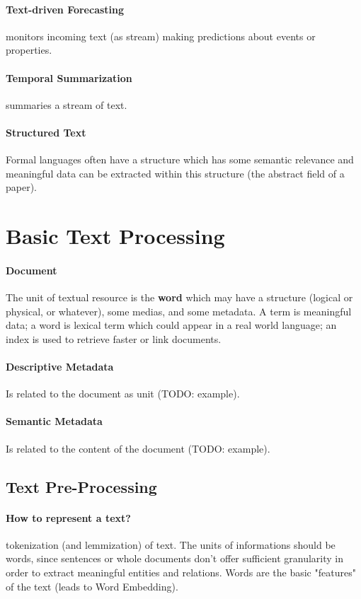 \paragraph{Text-driven Forecasting} monitors incoming text (as stream) making predictions about events or properties.

\paragraph{Temporal Summarization} summaries a stream of text.

\paragraph{Structured Text} Formal languages often have a structure which has some semantic relevance and meaningful data can be extracted within this structure (the abstract field of a paper).

\section{Basic Text Processing}

\paragraph{Document} The unit of textual resource is the \textbf{word} which may have a structure (logical or physical, or whatever), some medias, and some metadata.
A term is meaningful data; a word is lexical term which could appear in a real world language; an index is used to retrieve faster or link documents.

\paragraph{Descriptive Metadata} Is related to the document as unit (TODO: example).

\paragraph{Semantic Metadata} Is related to the content of the document (TODO: example).

\subsection{Text Pre-Processing}

\paragraph{How to represent a text?} tokenization (and lemmization) of text. The units of informations should be words, since sentences or whole documents don't offer sufficient granularity in order to extract meaningful entities and relations. Words are the basic "features" of the text (leads to Word Embedding).

